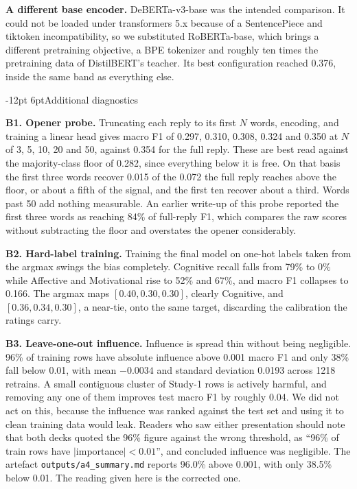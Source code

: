 \documentclass[11pt,a4paper]{article}
\makeatletter
\renewcommand\section{\@startsection{section}{1}{\z@}%
  {-12pt \@plus -3pt \@minus -2pt}{6pt}{\normalfont\large\bfseries}}
\makeatother
\begin{document}
\textbf{A different base encoder.} DeBERTa-v3-base was the intended comparison. It could
not be loaded under transformers 5.x because of a SentencePiece and tiktoken
incompatibility, so we substituted RoBERTa-base, which brings a different pretraining
objective, a BPE tokenizer and roughly ten times the pretraining data of DistilBERT's
teacher. Its best configuration reached 0.376, inside the same
band as everything else.

\section{Additional diagnostics}

\textbf{B1. Opener probe.} Truncating each reply to its first $N$ words, encoding, and
training a linear head gives macro F1 of 0.297, 0.310, 0.308, 0.324 and 0.350 at $N$ of 3,
5, 10, 20 and 50, against 0.354 for the full reply. These are best read against the
majority-class floor of 0.282, since everything below it is free. On that basis the first
three words recover 0.015 of the 0.072 the full reply reaches above the floor, or about a
fifth of the signal, and the first ten recover about a third. Words past 50 add nothing
measurable. An earlier write-up of this probe reported the first three words as reaching
84\% of full-reply F1, which compares the raw scores without subtracting the floor and
overstates the opener considerably.

\textbf{B2. Hard-label training.} Training the final model on one-hot labels taken from the
argmax swings the bias completely. Cognitive recall falls from 79\% to 0\% while Affective
and Motivational rise to 52\% and 67\%, and macro F1 collapses to 0.166. The argmax maps
$[0.40, 0.30, 0.30]$, clearly Cognitive, and $[0.36, 0.34, 0.30]$, a near-tie, onto the same
target, discarding the calibration the ratings carry.

\textbf{B3. Leave-one-out influence.} Influence is spread thin without being negligible.
96\% of training rows have absolute influence above 0.001 macro F1 and only 38\% fall below
0.01, with mean $-0.0034$ and standard deviation 0.0193 across 1218 retrains. A small
contiguous cluster of Study-1 rows is actively harmful, and removing any one of them
improves test macro F1 by roughly 0.04. We did not act on this, because the influence was
ranked against the test set and using it to clean training data would leak. Readers who saw
either presentation should note that both decks quoted the 96\% figure against the wrong
threshold, as ``96\% of train rows have $|$importance$| < 0.01$'', and concluded influence
was negligible. The artefact \texttt{outputs/a4\_summary.md} reports 96.0\% above 0.001,
with only 38.5\% below 0.01. The reading given here is the corrected one.
\end{document}
